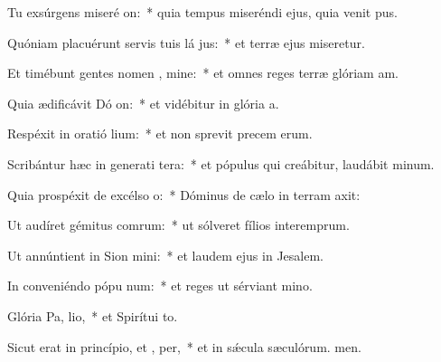 \item Tu exsúrgens miseré on:~* quia tempus miseréndi ejus, quia venit pus.
\item Quóniam placuérunt servis tuis lá jus:~* et terræ ejus miseretur.
\item Et timébunt gentes nomen , mine:~* et omnes reges terræ glóriam am.
\item Quia ædificávit Dó on:~* et vidébitur in glória a.
\item Respéxit in oratió lium:~* et non sprevit precem erum.
\item Scribántur hæc in generati tera:~* et pópulus qui creábitur, laudábit minum.
\item Quia prospéxit de excélso  o:~* Dóminus de cælo in terram axit:
\item Ut audíret gémitus comrum:~* ut sólveret fílios interemprum.
\item Ut annúntient in Sion  mini:~* et laudem ejus in Jesalem.
\item In conveniéndo pópu  num:~* et reges ut sérviant mino.
\item Glória Pa,  lio,~* et Spirítui to.
\item Sicut erat in princípio, et ,  per,~* et in sǽcula sæculórum. men.
